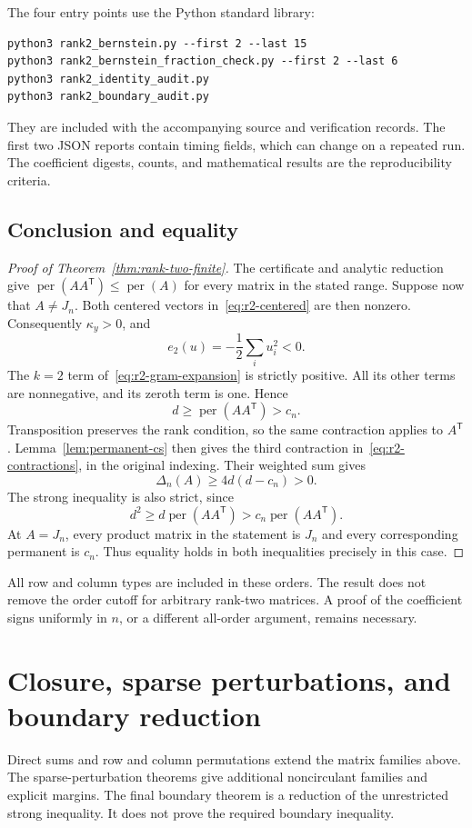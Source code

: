 \documentclass[11pt,a4paper]{article}
\theoremstyle{definition}
\theoremstyle{remark}
\newcommand{\per}{\operatorname{per}}
\newcommand{\T}{\mathsf{T}}
\begin{document}
The four entry points use the Python standard library:
\begin{verbatim}
python3 rank2_bernstein.py --first 2 --last 15
python3 rank2_bernstein_fraction_check.py --first 2 --last 6
python3 rank2_identity_audit.py
python3 rank2_boundary_audit.py
\end{verbatim}
They are included with the accompanying source and verification records.
The first two JSON reports contain timing fields, which can change on a repeated run.
The coefficient digests, counts, and mathematical results are the reproducibility criteria.

\subsection{Conclusion and equality}

\begin{proof}[Proof of Theorem~\ref{thm:rank-two-finite}]
The certificate and analytic reduction give
$\per(AA^\T)\le\per(A)$ for every matrix in the stated range.
Suppose now that $A\ne J_n$. Both centered vectors in~\eqref{eq:r2-centered} are then nonzero. Consequently $\kappa_y>0$, and
\[
e_2(u)=-\frac12\sum_i u_i^2<0.
\]
The $k=2$ term of~\eqref{eq:r2-gram-expansion} is strictly positive.
All its other terms are nonnegative, and its zeroth term is one.
Hence
\[
d\ge\per(AA^\T)>c_n.
\]
Transposition preserves the rank condition, so the same contraction applies to $A^\T$.
Lemma~\ref{lem:permanent-cs} then gives the third contraction in~\eqref{eq:r2-contractions}, in the original indexing.
Their weighted sum gives
\[
\Delta_n(A)\ge4d(d-c_n)>0.
\]
The strong inequality is also strict, since
\[
d^2\ge d\per(AA^\T)>c_n\per(AA^\T).
\]
At $A=J_n$, every product matrix in the statement is $J_n$ and every corresponding permanent is $c_n$.
Thus equality holds in both inequalities precisely in this case.
\end{proof}

All row and column types are included in these orders.
The result does not remove the order cutoff for arbitrary rank-two matrices.
A proof of the coefficient signs uniformly in $n$, or a different all-order argument, remains necessary.


\section{Closure, sparse perturbations, and boundary reduction}\label{sec:structural}

Direct sums and row and column permutations extend the matrix families above.
The sparse-perturbation theorems give additional noncirculant families and explicit margins.
The final boundary theorem is a reduction of the unrestricted strong inequality.
It does not prove the required boundary inequality.
\end{document}

